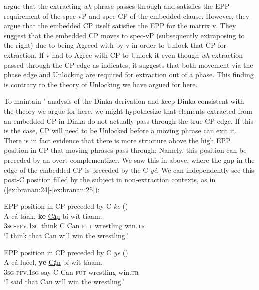 \documentclass[output=paper,colorlinks,citecolor=brown]{langscibook}
\begin{document}
\citeauthor{VanUrkRichards2015} argue that the extracting \textit{wh}-phrase passes through and satisfies the EPP requirement of the spec-vP and spec-CP of the embedded clause. However, they argue that the embedded CP itself satisfies the EPP for the matrix v. They suggest that the embedded CP moves to spec-vP (subsequently extraposing to the right) due to being Agreed with by v in order to Unlock that CP for extraction. If v had to Agree with CP to Unlock it even though \textit{wh}-extraction passed through the CP edge as  indicates, it suggests that both movement via the phase edge and Unlocking are required for extraction out of a phase. This finding is contrary to the theory of Unlocking we have argued for here.

To maintain \citeauthor{VanUrkRichards2015}' analysis of the Dinka derivation and keep Dinka consistent with the theory we argue for here, we might hypothesize that elements extracted from an embedded CP in Dinka do not actually pass through the true CP edge. If this is the case, CP will need to be Unlocked before a moving phrase can exit it. There is in fact evidence that there is more structure above the high EPP position in CP that moving phrases pass through: Namely, this position can be preceded by an overt complementizer. We saw this in  above, where the gap in the edge of the embedded CP is preceded by the C \textit{y\'{e}}. We can independently see this post-C position filled by the subject in non-extraction contexts, as in (\ref{ex:branan:24}-\ref{ex:branan:25}):

\ea%
    \label{ex:branan:24}
    EPP position in CP preceded by C \textit{ke}
    \hfill{(\citealt[ex. 4a]{VanUrkRichards2015})}\\
    \gll    A-c\'{a} t\'{a}ak, \textbf{ke}  \underline{Cà̤n} b\'{i}  w\'{i}t t\'{i}aam. \\
            3\textsc{sg-pfv.1sg} think C Can \textsc{fut} wrestling win.\textsc{tr} \\
    \glt    `I think that Can will win the wrestling.'
\z

\ea%
    \label{ex:branan:25}
    EPP position in CP preceded by C \textit{ye}
    \hfill{(\citealt[ex. 4b]{VanUrkRichards2015})}\\
    \gll    A-c\'{a} lu\'{e}el, \textbf{ye}  \underline{Cà̤n} b\'{i}  w\'{i}t t\'{i}aam. \\
            3\textsc{sg-pfv.1sg} say C Can \textsc{fut} wrestling win.\textsc{tr}  \\
    \glt    `I said that Can will win the wrestling.'
\z
\end{document}
